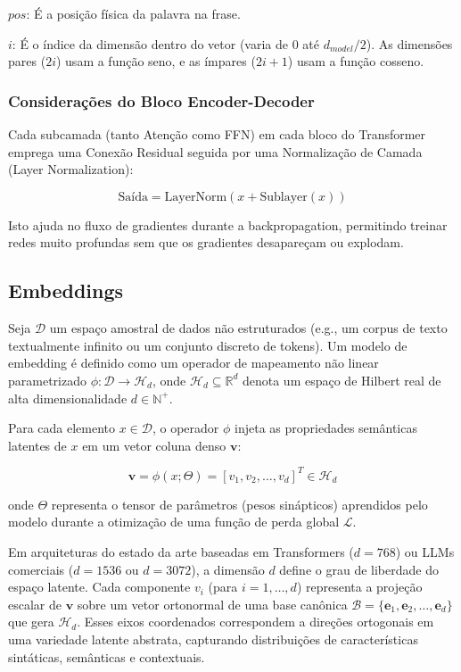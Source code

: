 \documentclass[12pt]{article}
\begin{document}
     $pos$: É a posição física da palavra na frase.
     
     $i$: É o índice da dimensão dentro do vetor (varia de $0$ até $d_{model}/2$). As dimensões pares ($2i$) usam a função seno, e as ímpares ($2i+1$) usam a função cosseno.
 
    \subsubsection{Considerações do Bloco Encoder-Decoder}
    
    Cada subcamada (tanto Atenção como FFN) em cada bloco do Transformer emprega uma Conexão Residual seguida por uma Normalização de Camada (Layer Normalization):
    
    $$\text{Saída} = \text{LayerNorm}(x + \text{Sublayer}(x))$$
    
    Isto ajuda no fluxo de gradientes durante a backpropagation, permitindo treinar redes muito profundas sem que os gradientes desapareçam ou explodam.

    
	\subsection{Embeddings}
	
	Seja $\mathcal{D}$ um espaço amostral de dados não estruturados (e.g., um corpus de texto textualmente infinito ou um conjunto discreto de tokens). Um modelo de embedding é definido como um operador de mapeamento não linear parametrizado $\phi: \mathcal{D} \to \mathcal{H}_d$, onde $\mathcal{H}_d \subseteq \mathbb{R}^d$ denota um espaço de Hilbert real de alta dimensionalidade $d \in \mathbb{N}^+$.
    
    Para cada elemento $x \in \mathcal{D}$, o operador $\phi$ injeta as propriedades semânticas latentes de $x$ em um vetor coluna denso $\mathbf{v}$:
    
    $$\mathbf{v} = \phi(x; \Theta) = [v_1, v_2, \dots, v_d]^T \in \mathcal{H}_d$$
    
    onde $\Theta$ representa o tensor de parâmetros (pesos sinápticos) aprendidos pelo modelo durante a otimização de uma função de perda global $\mathcal{L}$.
    
    Em arquiteturas do estado da arte baseadas em Transformers ($d = 768$) ou LLMs comerciais ($d = 1536$ ou $d = 3072$), a dimensão $d$ define o grau de liberdade do espaço latente. Cada componente $v_i$ (para $i = 1, \dots, d$) representa a projeção escalar de $\mathbf{v}$ sobre um vetor ortonormal de uma base canônica $\mathcal{B} = \{\mathbf{e}_1, \mathbf{e}_2, \dots, \mathbf{e}_d\}$ que gera $\mathcal{H}_d$. Esses eixos coordenados correspondem a direções ortogonais em uma variedade latente abstrata, capturando distribuições de características sintáticas, semânticas e contextuais.
    
\end{document}
